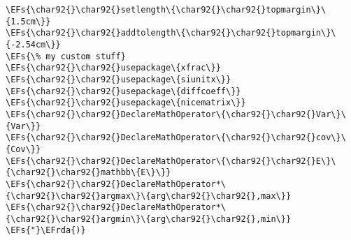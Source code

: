 \documentclass[c]{article}
\theoremstyle{plain}%
\theoremstyle{definition}
\theoremstyle{remark}
\newcommand{\EFs}[1]{\textcolor{EFs}{#1}} %
\newcommand{\EFrda}[1]{\textcolor{EFrda}{#1}} %
\begin{document}
\begin{enumerate}
\begin{Code}
\begin{Verbatim}
\EFs{\char92{}\char92{}setlength\{\char92{}\char92{}topmargin\}\{1.5cm\}}
\EFs{\char92{}\char92{}addtolength\{\char92{}\char92{}topmargin\}\{-2.54cm\}}
\EFs{\% my custom stuff}
\EFs{\char92{}\char92{}usepackage\{xfrac\}}
\EFs{\char92{}\char92{}usepackage\{siunitx\}}
\EFs{\char92{}\char92{}usepackage\{diffcoeff\}}
\EFs{\char92{}\char92{}usepackage\{nicematrix\}}
\EFs{\char92{}\char92{}DeclareMathOperator\{\char92{}\char92{}Var\}\{Var\}}
\EFs{\char92{}\char92{}DeclareMathOperator\{\char92{}\char92{}cov\}\{Cov\}}
\EFs{\char92{}\char92{}DeclareMathOperator\{\char92{}\char92{}E\}\{\char92{}\char92{}mathbb\{E\}\}}
\EFs{\char92{}\char92{}DeclareMathOperator*\{\char92{}\char92{}argmax\}\{arg\char92{}\char92{},max\}}
\EFs{\char92{}\char92{}DeclareMathOperator*\{\char92{}\char92{}argmin\}\{arg\char92{}\char92{},min\}}
\EFs{"}\EFrda{)}

\end{Verbatim}
\end{Code}
\end{enumerate}
\end{document}
